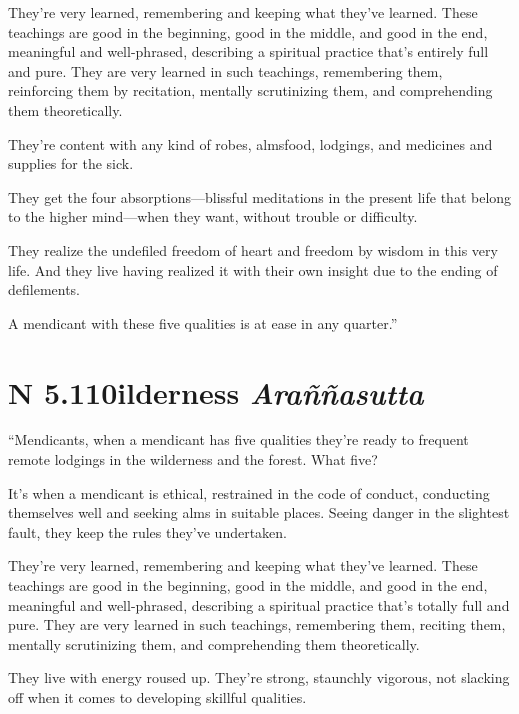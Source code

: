 \documentclass[12pt,openany]{book}%
\newcommand*{\suttatitleacronym}[1]{\smaller[2]{#1}\vspace*{.3em}}
\newcommand*{\suttatitletranslation}[1]{\linebreak{#1}}
\newcommand*{\suttatitleroot}[1]{\linebreak\smaller[2]\itshape{#1}}
\newcommand*{\tocacronym}[1]{\hspace*{-3.3em}{#1}\quad}
\newcommand*{\toctranslation}[1]{#1}
\newcommand*{\tocroot}[1]{(\textit{#1})}
\begin{document}
They’re very learned, remembering and keeping what they’ve learned. These teachings are good in the beginning, good in the middle, and good in the end, meaningful and well-phrased, describing a spiritual practice that’s entirely full and pure. They are very learned in such teachings, remembering them, reinforcing them by recitation, mentally scrutinizing them, and comprehending them theoretically. 

They’re content with any kind of robes, almsfood, lodgings, and medicines and supplies for the sick. 

They get the four absorptions—blissful meditations in the present life that belong to the higher mind—when they want, without trouble or difficulty. 

They realize the undefiled freedom of heart and freedom by wisdom in this very life. And they live having realized it with their own insight due to the ending of defilements. 

A mendicant with these five qualities is at ease in any quarter.” 

%
\section*{{\suttatitleacronym AN 5.110}{\suttatitletranslation Wilderness }{\suttatitleroot Araññasutta}}
\addcontentsline{toc}{section}{\tocacronym{AN 5.110} \toctranslation{Wilderness } \tocroot{Araññasutta}}

“Mendicants, when a mendicant has five qualities they’re ready to frequent remote lodgings in the wilderness and the forest. What five? 

It’s when a mendicant is ethical, restrained in the code of conduct, conducting themselves well and seeking alms in suitable places. Seeing danger in the slightest fault, they keep the rules they’ve undertaken. 

They’re very learned, remembering and keeping what they’ve learned. These teachings are good in the beginning, good in the middle, and good in the end, meaningful and well-phrased, describing a spiritual practice that’s totally full and pure. They are very learned in such teachings, remembering them, reciting them, mentally scrutinizing them, and comprehending them theoretically. 

They live with energy roused up. They’re strong, staunchly vigorous, not slacking off when it comes to developing skillful qualities. 
\end{document}
